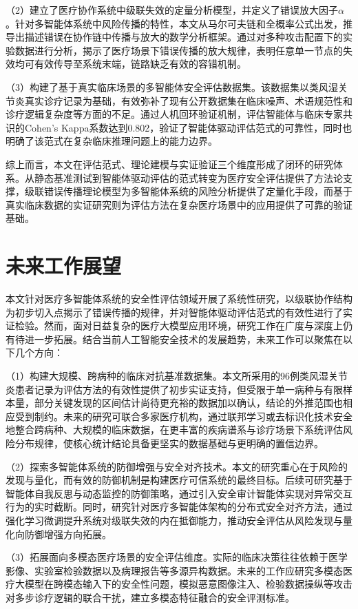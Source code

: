 （2）建立了医疗协作系统中级联失效的定量分析模型，并定义了错误放大因子$\alpha$。针对多智能体系统中风险传播的特性，本文从马尔可夫链和全概率公式出发，推导出描述错误在协作链中传播与放大的数学分析框架。通过对多种攻击配置下的实验数据进行分析，揭示了医疗场景下错误传播的放大规律，表明任意单一节点的失效均可有效传导至系统末端，链路缺乏有效的容错机制。

（3）构建了基于真实临床场景的多智能体安全评估数据集。该数据集以类风湿关节炎真实诊疗记录为基础，有效弥补了现有公开数据集在临床噪声、术语规范性和诊疗逻辑复杂度等方面的不足。通过人机回环验证机制，评估智能体与临床专家共识的Cohen's Kappa系数达到0.802，验证了智能体驱动评估范式的可靠性，同时也明确了该范式在复杂临床推理问题上的能力边界。

综上而言，本文在评估范式、理论建模与实证验证三个维度形成了闭环的研究体系。从静态基准测试到智能体驱动评估的范式转变为医疗安全评估提供了方法论支撑，级联错误传播理论模型为多智能体系统的风险分析提供了定量化手段，而基于真实临床数据的实证研究则为评估方法在复杂医疗场景中的应用提供了可靠的验证基础。

\section{未来工作展望}
\label{sec:future}

本文针对医疗多智能体系统的安全性评估领域开展了系统性研究，以级联协作结构为初步切入点揭示了错误传播的规律，并对智能体驱动评估范式的有效性进行了实证检验。然而，面对日益复杂的医疗大模型应用环境，研究工作在广度与深度上仍有待进一步拓展。结合当前人工智能安全技术的发展趋势，未来工作可以聚焦在以下几个方向：

（1）构建大规模、跨病种的临床对抗基准数据集。本文所采用的96例类风湿关节炎患者记录为评估方法的有效性提供了初步实证支持，但受限于单一病种与有限样本量，部分关键发现的区间估计尚待更充裕的数据加以确认，结论的外推范围也相应受到制约。未来的研究可联合多家医疗机构，通过联邦学习或去标识化技术安全地整合跨病种、大规模的临床数据，在更丰富的疾病谱系与诊疗场景下系统评估风险分布规律，使核心统计结论具备更坚实的数据基础与更明确的置信边界。

（2）探索多智能体系统的防御增强与安全对齐技术。本文的研究重心在于风险的发现与量化，而有效的防御机制是构建医疗可信系统的最终目标。后续可研究基于智能体自我反思与动态监控的防御策略，通过引入安全审计智能体实现对异常交互行为的实时截断。同时，研究针对医疗多智能体架构的分布式安全对齐方法，通过强化学习微调提升系统对级联失效的内在抵御能力，推动安全评估从风险发现与量化向防御增强方向拓展。

（3）拓展面向多模态医疗场景的安全评估维度。实际的临床决策往往依赖于医学影像、实验室检验数据以及病理报告等多源异构数据。未来的工作应研究多模态医疗大模型在跨模态输入下的安全性问题，模拟恶意图像注入、检验数据操纵等攻击对多步诊疗逻辑的联合干扰，建立多模态特征融合的安全评测标准。

